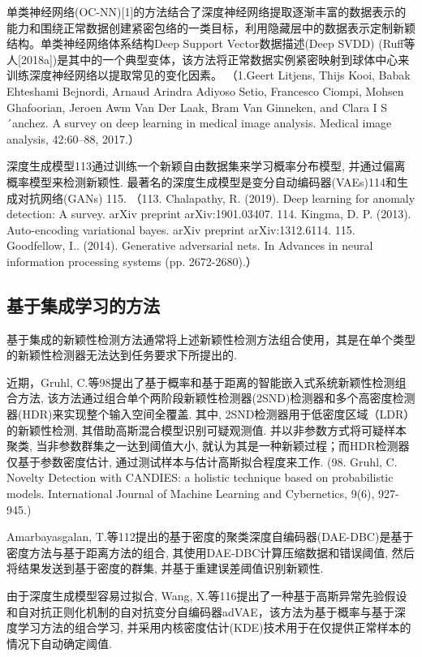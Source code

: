 \documentclass{Style/aas}
\begin{document}
\begin{multicols}{2}
  单类神经网络(OC-NN)[1]的方法结合了深度神经网络提取逐渐丰富的数据表示的能力和围绕正常数据创建紧密包络的一类目标，利用隐藏层中的数据表示定制新颖结构。单类神经网络体系结构Deep Support Vector数据描述(Deep SVDD) (Ruff等人[2018a])是其中的一个典型变体，该方法将正常数据实例紧密映射到球体中心来训练深度神经网络以提取常见的变化因素。
  （1.Geert Litjens, Thijs Kooi, Babak Ehteshami Bejnordi, Arnaud Arindra Adiyoso Setio, Francesco Ciompi, Mohsen Ghafoorian, Jeroen Awm Van Der Laak, Bram Van Ginneken, and Clara I S´anchez. A survey on deep learning in medical image analysis. Medical image analysis, 42:60–88, 2017.）

  深度生成模型113通过训练一个新颖自由数据集来学习概率分布模型, 并通过偏离概率模型来检测新颖性. 最著名的深度生成模型是变分自动编码器(VAEs)114和生成对抗网络(GANs) 115.
  （113. Chalapathy, R. (2019). Deep learning for anomaly detection: A survey. arXiv preprint arXiv:1901.03407.
  114.	Kingma, D. P. (2013). Auto-encoding variational bayes. arXiv preprint arXiv:1312.6114.
  115.	Goodfellow, I.. (2014). Generative adversarial nets. In Advances in neural information processing systems (pp. 2672-2680).）


  \subsection{基于集成学习的方法}
  基于集成的新颖性检测方法通常将上述新颖性检测方法组合使用，其是在单个类型的新颖性检测器无法达到任务要求下所提出的.

  近期，Gruhl, C.等98提出了基于概率和基于距离的智能嵌入式系统新颖性检测组合方法, 该方法通过组合单个两阶段新颖性检测器(2SND)检测器和多个高密度检测器(HDR)来实现整个输入空间全覆盖. 其中, 2SND检测器用于低密度区域（LDR）的新颖性检测, 其借助高斯混合模型识别可疑观测值. 并以非参数方式将可疑样本聚类, 当非参数群集之一达到阈值大小, 就认为其是一种新颖过程；而HDR检测器仅基于参数密度估计, 通过测试样本与估计高斯拟合程度来工作. (98.	Gruhl, C. Novelty Detection with CANDIES: a holistic technique based on probabilistic models. International Journal of Machine Learning and Cybernetics, 9(6), 927-945.)

  Amarbayasgalan, T.等112提出的基于密度的聚类深度自编码器(DAE-DBC)是基于密度方法与基于距离方法的组合, 其使用DAE-DBC计算压缩数据和错误阈值, 然后将结果发送到基于密度的群集, 并基于重建误差阈值识别新颖性.

  由于深度生成模型容易过拟合, Wang, X.等116提出了一种基于高斯异常先验假设和自对抗正则化机制的自对抗变分自编码器adVAE，该方法为基于概率与基于深度学习方法的组合学习, 并采用内核密度估计(KDE)技术用于在仅提供正常样本的情况下自动确定阈值.


\end{multicols}
\end{document}
